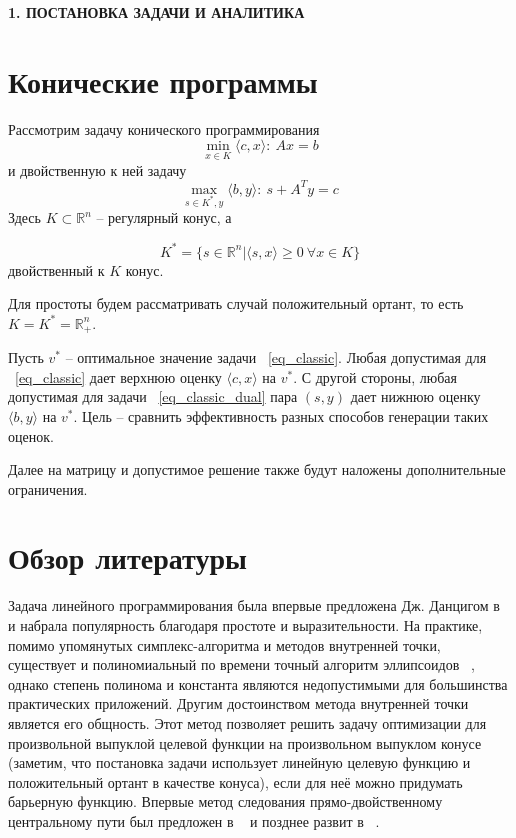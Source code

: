 \newpage
\begin{center}
  \textbf{\large 1. ПОСТАНОВКА ЗАДАЧИ И АНАЛИТИКА}
\end{center}


\section{Конические программы}

Рассмотрим задачу конического программирования
\begin{equation}
  \min_{x \in K} \langle c, x \rangle : \ Ax = b
\label{eq_classic}
\end{equation}
и двойственную к ней задачу
\begin{equation}
  \max_{s \in K^*, y} \langle b, y \rangle : \ s+A^Ty = c
\label{eq_classic_dual}
\end{equation}
Здесь $ K \subset \mathbb{R}^n $ -- регулярный конус, а

$$
K^* = \{ s \in \mathbb{R}^n | \langle s, x \rangle \geq 0 \ \forall x \in K \}
$$
двойственный к $K$ конус.

Для простоты будем рассматривать случай положительный ортант, то есть $ K = K^* = \mathbb{R}^n_+ $.

Пусть $v^*$ -- оптимальное значение задачи ~\ref{eq_classic}. Любая допустимая для ~\ref{eq_classic} дает верхнюю оценку $ \langle c, x \rangle $ на $ v^* $. С другой стороны, любая допустимая для задачи ~\ref{eq_classic_dual} пара $ \left( s, y \right) $ дает нижнюю оценку $ \langle b, y \rangle $ на $ v^* $. Цель -- сравнить эффективность разных способов генерации таких оценок.

Далее на матрицу и допустимое решение также будут наложены дополнительные ограничения.

\section{Обзор литературы}
 
Задача линейного программирования была впервые предложена Дж. Данцигом в ~\cite{dantzig2002} и набрала популярность благодаря простоте и выразительности.
На практике, помимо упомянутых симплекс-алгоритма и методов внутренней точки, существует и полиномиальный по времени точный алгоритм эллипсоидов ~\cite{karmarkar1984}, однако степень полинома и константа являются недопустимыми для большинства практических приложений.
Другим достоинством метода внутренней точки является его общность. Этот метод позволяет решить задачу оптимизации для произвольной выпуклой целевой функции на произвольном выпуклом конусе ~\cite{nesterov1994} (заметим, что постановка задачи использует линейную целевую функцию и положительный ортант в качестве конуса), если для неё можно придумать барьерную функцию.
Впервые метод следования прямо-двойственному центральному пути был предложен в ~\cite{renegar1988} и позднее развит в ~\cite{nesterov1998}.

